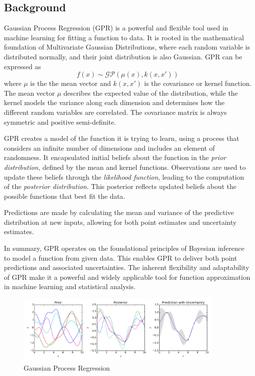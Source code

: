 \subsection{Background}

Gaussian Process Regression (GPR) is a powerful and flexible tool used in machine learning for fitting a function to data. It is rooted in the mathematical foundation of Multivariate Gaussian Distributions, where each random variable is distributed normally, and their joint distribution is also Gaussian. GPR can be expressed as 
\begin{equation}
    f(x) \sim \mathcal{GP}(\mu(x), k(x, x'))
\end{equation}
where  \( \mu \) is the the mean vector and \( k(x, x') \) is the covariance or kernel function. The mean vector \( \mu \) describes the expected value of the distribution, while the kernel models the variance along each dimension and determines how the different random variables are correlated. The covariance matrix is always symmetric and positive semi-definite.

GPR creates a model of the function it is trying to learn, using a process that considers an infinite number of dimensions and includes an element of randomness. It encapsulated initial beliefs about the function in the \textit{prior distribution}, defined by the mean and kernel functions. Observations are used to update these beliefs through the \textit{likelihood function}, leading to the computation of the \textit{posterior distribution}. This posterior reflects updated beliefs about the possible functions that best fit the data.

Predictions are made by calculating the mean and variance of the predictive distribution at new inputs, allowing for both point estimates and uncertainty estimates. 

In summary, GPR operates on the foundational principles of Bayesian inference to model a function from given data. This enables GPR to deliver both point predictions and associated uncertainties. The inherent flexibility and adaptability of GPR make it a powerful and widely applicable tool for function approximation in machine learning and statistical analysis. \cite{GPR}

\begin{figure}[h!]
    \centering
    \includegraphics[width=0.9\textwidth]{Pictures/Model/Gaussian_Process_Regression.png}
    \caption{Gaussian Process Regression \cite{GPR_Image}}
    \label{fig:GPR}
\end{figure}





